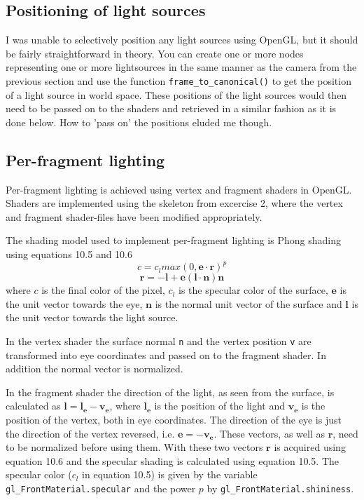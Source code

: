 \documentclass[10pt,a4paper]{article}
\begin{document}
\subsection{Positioning of light sources}
I was unable to selectively position any light sources using OpenGL, but it should be fairly straightforward in theory. You can create one or more nodes representing one or more lightsources in the same manner as the camera from the previous section and use the function \texttt{frame\_to\_canonical()} to get the position of a light source in world space. These positions of the light sources would then need to be passed on to the shaders and retrieved in a similar fashion as it is done below. How to 'pass on' the positions eluded me though.

\subsection{Per-fragment lighting}
Per-fragment lighting is achieved using vertex and fragment shaders in OpenGL. Shaders are implemented using the skeleton from excercise 2, where the vertex and fragment shader-files have been modified appropriately.

The shading model used to implement per-fragment lighting is Phong shading using equations 10.5 and 10.6
\[
  c = c_l max(0, \mathbf{e} \cdot \mathbf{r})^p
\]\[
  \mathbf{r} = -\mathbf{l} + \mathbf{e}(\mathbf{l} \cdot \mathbf{n})\mathbf{n}
\]
where $c$ is the final color of the pixel, $c_l$ is the specular color of the surface, $\mathbf{e}$ is the unit vector towards the eye, $\mathbf{n}$ is the normal unit vector of the surface and $\mathbf{l}$ is the unit vector towards the light source. 

In the vertex shader the surface normal \texttt{n} and the vertex position \texttt{v} are transformed into eye coordinates and passed on to the fragment shader. In addition the normal vector is normalized.

In the fragment shader the direction of the light, as seen from the surface, is calculated as $\mathbf{l} = \mathbf{l_e} - \mathbf{v_e}$, where $\mathbf{l_e}$ is the position of the light and $\mathbf{v_e}$ is the position of the vertex, both in eye coordinates. The direction of the eye is just the direction of the vertex reversed, i.e. $\mathbf{e} = -\mathbf{v_e}$. These vectors, as well as $\mathbf{r}$, need to be normalized before using them. With these two vectors $\mathbf{r}$ is acquired using equation 10.6 and the specular shading is calculated using equation 10.5. The specular color ($c_l$ in equation 10.5) is given by the variable \texttt{gl\_FrontMaterial.specular} and the power $p$ by \texttt{gl\_FrontMaterial.shininess}.
\end{document}
